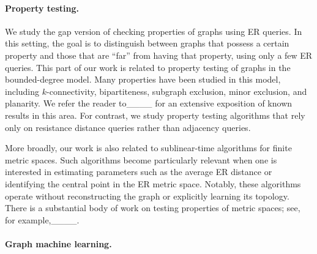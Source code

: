 \paragraph{Property testing.}
We study the gap version of checking properties of graphs using ER queries. In this setting, the goal is to distinguish between graphs that possess a certain property and those that are ``far'' from having that property, using only a few ER queries. This part of our work is related to property testing of graphs in the bounded-degree model. Many properties have been studied in this model, including $k$-connectivity, bipartiteness, subgraph exclusion, minor exclusion, and planarity. We refer the reader to____ for an extensive exposition of known results in this area. 
For contrast, we study property testing algorithms that rely only on resistance distance queries rather than adjacency queries. 

More broadly, our work is also related to sublinear-time algorithms for finite metric spaces. Such algorithms become particularly relevant when one is interested in estimating parameters such as the average ER distance or identifying the central point in the ER metric space. Notably, these algorithms operate without reconstructing the graph or explicitly learning its topology. There is a substantial body of work on testing properties of metric spaces; see, for example,____.

\paragraph{Graph machine learning.}

